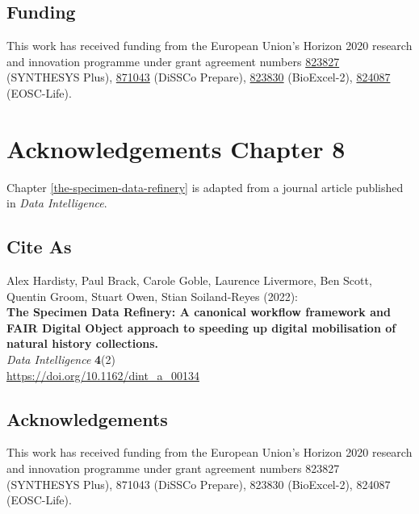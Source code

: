 \hypertarget{funding-2}{%
\subsection*{Funding}\label{funding-2}}

This work has received funding from the European Union's Horizon 2020
research and innovation programme under grant agreement numbers
\href{https://doi.org/10.3030/https://doi.org/10.3030/}{823827}
(SYNTHESYS Plus), \href{https://doi.org/10.3030/871043}{871043} (DiSSCo
Prepare), \href{https://doi.org/10.3030/823830}{823830} (BioExcel-2),
\href{https://doi.org/10.3030/824087}{824087} (EOSC-Life).




\section{Acknowledgements Chapter 8}

Chapter \vref{the-specimen-data-refinery} is adapted from a journal article published in \emph{Data Intelligence}.

\subsection*{Cite As}

Alex Hardisty, Paul Brack, Carole Goble, Laurence Livermore, Ben Scott,
Quentin Groom, Stuart Owen, Stian Soiland-Reyes (2022):\\
\textbf{The Specimen Data Refinery: A canonical workflow framework and
FAIR Digital Object approach to speeding up digital mobilisation of
natural history collections.}\\
\emph{Data Intelligence} \textbf{4}(2)\\
\url{https://doi.org/10.1162/dint_a_00134}


\subsection*{Acknowledgements}

This work has received funding from the European Union's Horizon 2020
research and innovation programme under grant agreement numbers 823827
(SYNTHESYS Plus), 871043 (DiSSCo Prepare), 823830 (BioExcel-2), 824087
(EOSC-Life).




